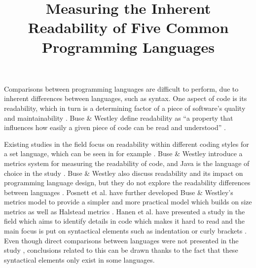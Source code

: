 \documentclass[times, 10pt,twocolumn]{IEEEtran}
\begin{document}
\title{Measuring the Inherent Readability of Five Common Programming Languages}

\author{


}
\maketitle
\thispagestyle{empty}


Comparisons between programming languages are difficult to perform, due to inherent differences between languages, such as syntax. One aspect of code is its readability, which in turn is a determining factor of a piece of software's quality and maintainability \cite{aggarwal2002integrated, elshoff1982improving}. Buse \& Westley define readability as ``a property that influences how easily a given piece of code can be read and understood'' \cite{buse2010learning}. 
\newline

Existing studies in the field focus on readability within different coding styles for a set language, which can be seen in for example \cite{buse2010learning}. Buse \& Westley introduce a metrics system for measuring the readability of code, and Java is the language of choice in the study \cite{buse2010learning}. Buse \& Westley also discuss readability and its impact on programming language design, but they do not explore the readability differences between languages \cite{buse2010learning}. Posnett et al. \cite{posnett2011simpler} have further developed Buse \& Westley's metrics model to provide a simpler and more practical model which builds on size metrics as well as Halstead metrics \cite{halstead1977elements}. Hanen et al. have presented a study in the field which aims to identify details in code which makes it hard to read and the main focus is put on syntactical elements such as indentation or curly brackets \cite{hansen2013makes}. Even though direct comparisons between languages were not presented in the study \cite{hansen2013makes}, conclusions related to this can be drawn thanks to the fact that these syntactical elements only exist in some languages. 
\newline
\end{document}
